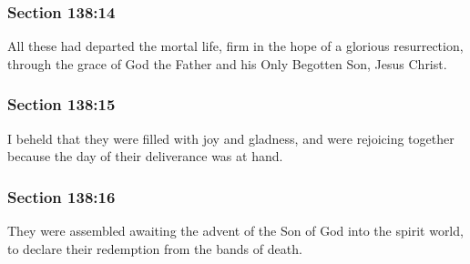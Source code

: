 	\subsubsection{Section 138:14} %
		\label{DC138-14}

		All these had departed the mortal life, firm in the hope of a glorious resurrection, through the grace of God the Father and his Only Begotten Son, Jesus Christ.


	\subsubsection{Section 138:15} %
		\label{DC138-15}

		I beheld that they were filled with joy and gladness, and were rejoicing together because the day of their deliverance was at hand.


	\subsubsection{Section 138:16} %
		\label{DC138-16}

		They were assembled awaiting the advent of the Son of God into the spirit world, to declare their redemption from the bands of death.


